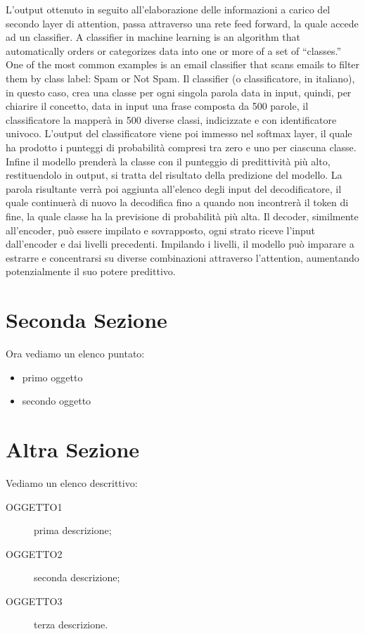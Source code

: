 \begin{itemize}
		L'output ottenuto in seguito all'elaborazione delle informazioni a carico del secondo layer di attention, passa attraverso una rete feed forward, la quale accede ad un classifier.
		A classifier in machine learning is an algorithm that automatically orders or categorizes data into one or more of a set of “classes.” One of the most common examples is an email classifier that scans emails to filter them by class label: Spam or Not Spam.
		Il classifier (o classificatore, in italiano), in questo caso, crea una classe per ogni singola parola data in input, quindi, per chiarire il concetto, data in input una frase composta da 500 parole, il classificatore la mapperà in 500 diverse classi, indicizzate e con identificatore univoco. L'output del classificatore viene poi immesso nel softmax layer, il quale ha prodotto i punteggi di probabilità compresi tra zero e uno per ciascuna classe.  Infine il modello prenderà la classe con il punteggio di predittività più alto, restituendolo in output, si tratta del risultato della predizione del modello.  La parola risultante verrà poi aggiunta all'elenco degli input del decodificatore, il quale continuerà di nuovo la decodifica fino a quando non incontrerà il token di fine, la quale classe ha la previsione di probabilità più alta. Il decoder, similmente all'encoder, può essere impilato e sovrapposto, ogni strato riceve l'input dall'encoder e dai livelli precedenti. Impilando i livelli, il modello può imparare a estrarre e concentrarsi su diverse combinazioni attraverso l'attention, aumentando potenzialmente il suo potere predittivo.



\end{itemize}

\section{Seconda Sezione}
Ora vediamo un elenco puntato:
\begin{itemize}                         %
\item primo oggetto
\item secondo oggetto
\end{itemize}

\section{Altra Sezione}
Vediamo un elenco descrittivo:
\begin{description}                     %
  \item[OGGETTO1] prima descrizione;
  \item[OGGETTO2] seconda descrizione;
  \item[OGGETTO3] terza descrizione.
\end{description}

